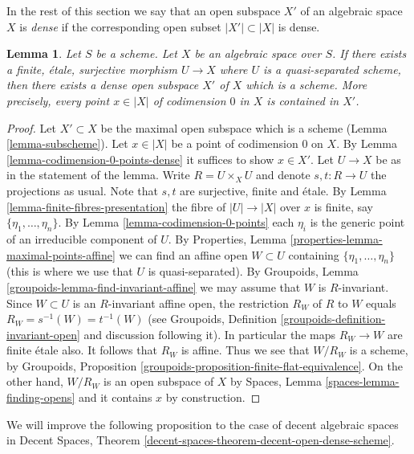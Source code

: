 \documentclass{stacks-project}
\theoremstyle{plain}
\newtheorem{lemma}[subsection]{Lemma}
\theoremstyle{definition}
\theoremstyle{remark}
\numberwithin{equation}{subsection}
\begin{document}
\noindent
In the rest of this section we say that an open subspace
$X'$ of an algebraic space $X$ is {\it dense} if the corresponding
open subset $|X'| \subset |X|$ is dense.

\begin{lemma}
\label{lemma-quasi-separated-finite-etale-cover-dense-open-scheme}
Let $S$ be a scheme. Let $X$ be an algebraic space over $S$.
If there exists a finite, \'etale, surjective morphism
$U \to X$ where $U$ is a quasi-separated scheme, then
there exists a dense open subspace $X'$ of $X$ which is a scheme.
More precisely, every point $x \in |X|$ of codimension $0$ in $X$
is contained in $X'$.
\end{lemma}

\begin{proof}
Let $X' \subset X$ be the maximal open subspace which is a scheme
(Lemma \ref{lemma-subscheme}).
Let $x \in |X|$ be a point of codimension $0$ on $X$.
By Lemma \ref{lemma-codimension-0-points-dense}
it suffices to show $x \in X'$.
Let $U \to X$ be as in the statement of the lemma.
Write $R = U \times_X U$ and denote $s, t : R \to U$ the projections as usual.
Note that $s, t$ are surjective, finite and \'etale.
By Lemma \ref{lemma-finite-fibres-presentation}
the fibre of $|U| \to |X|$ over $x$ is finite, say
$\{\eta_1, \ldots, \eta_n\}$. By Lemma \ref{lemma-codimension-0-points}
each $\eta_i$ is the generic point of an irreducible component of $U$.
By Properties, Lemma \ref{properties-lemma-maximal-points-affine}
we can find an affine open $W \subset U$ containing
$\{\eta_1, \ldots, \eta_n\}$
(this is where we use that $U$ is quasi-separated). By
Groupoids, Lemma \ref{groupoids-lemma-find-invariant-affine}
we may assume that $W$ is $R$-invariant.
Since $W \subset U$ is an $R$-invariant affine open, the restriction
$R_W$ of $R$ to $W$ equals $R_W = s^{-1}(W) = t^{-1}(W)$ (see
Groupoids, Definition \ref{groupoids-definition-invariant-open}
and discussion following it). In particular the maps $R_W \to W$ are
finite \'etale also. It follows that $R_W$ is affine.
Thus we see that $W/R_W$ is a scheme, by
Groupoids, Proposition \ref{groupoids-proposition-finite-flat-equivalence}.
On the other hand, $W/R_W$ is an open subspace of $X$ by
Spaces, Lemma \ref{spaces-lemma-finding-opens} and it contains
$x$ by construction.
\end{proof}

\noindent
We will improve the following proposition to the case of
decent algebraic spaces in
Decent Spaces, Theorem
\ref{decent-spaces-theorem-decent-open-dense-scheme}.
\end{document}

